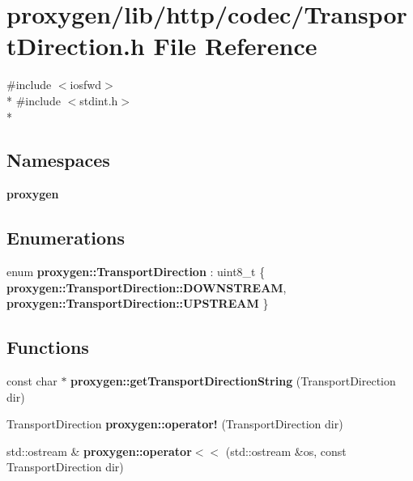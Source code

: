 \section{proxygen/lib/http/codec/\+Transport\+Direction.h File Reference}
\label{TransportDirection_8h}
{\ttfamily \#include $<$iosfwd$>$}\\*
{\ttfamily \#include $<$stdint.\+h$>$}\\*
\subsection*{Namespaces}
\begin{DoxyCompactItemize}
\item 
 {\bf proxygen}
\end{DoxyCompactItemize}
\subsection*{Enumerations}
\begin{DoxyCompactItemize}
\item 
enum {\bf proxygen\+::\+Transport\+Direction} \+: uint8\+\_\+t \{ {\bf proxygen\+::\+Transport\+Direction\+::\+D\+O\+W\+N\+S\+T\+R\+E\+AM}, 
{\bf proxygen\+::\+Transport\+Direction\+::\+U\+P\+S\+T\+R\+E\+AM}
 \}
\end{DoxyCompactItemize}
\subsection*{Functions}
\begin{DoxyCompactItemize}
\item 
const char $\ast$ {\bf proxygen\+::get\+Transport\+Direction\+String} (Transport\+Direction dir)
\item 
Transport\+Direction {\bf proxygen\+::operator!} (Transport\+Direction dir)
\item 
std\+::ostream \& {\bf proxygen\+::operator$<$$<$} (std\+::ostream \&os, const Transport\+Direction dir)
\end{DoxyCompactItemize}
